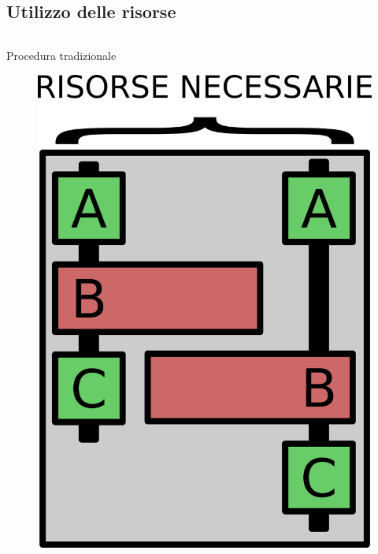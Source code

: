 \documentclass{beamer}
\begin{document}
\subsection{Utilizzo delle risorse}
\begin{frame}
\begin{columns}
\begin{column}{0.8\linewidth}
\begin{block}{Procedura tradizionale}
\begin{figure}[H]
\centering
\includegraphics[scale=0.3]{concurrency2.png}
\end{figure}
\end{block}
\end{column}
\end{columns}
\end{frame}
\end{document}
